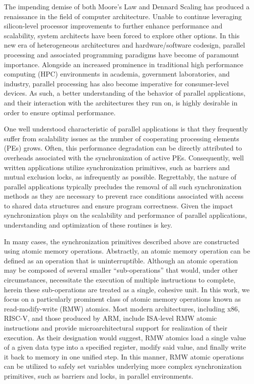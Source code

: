 
The impending demise of both Moore's Law and Dennard Scaling has produced a renaissance in the field of computer architecture.
Unable to continue leveraging silicon-level processor improvements to further enhance performance and scalability, system architects have been forced to explore other options.
In this new era of heterogeneous architectures and hardware/software codesign, parallel processing and associated programming paradigms have become of paramount importance.
Alongside an increased prominence in traditional high performance computing (HPC) environments in academia, government laboratories, and industry, parallel processing has also become imperative for consumer-level devices.
As such, a better understanding of the behavior of parallel applications, and their interaction with the architectures they run on, is highly desirable in order to ensure optimal performance.

One well understood characteristic of parallel applications is that they frequently suffer from scalability issues as the number of cooperating processing elements (PEs) grows.
Often, this performance degradation can be directly attributed to overheads associated with the synchronization of active PEs.
Consequently, well written applications utilize synchronization primitives, such as barriers and mutual exclusion locks, as infrequently as possible.
Regrettably, the nature of parallel applications typically precludes the removal of all such synchronization methods as they are necessary to prevent race conditions associated with access to shared data structures and ensure program correctness.
Given the impact synchronization plays on the scalability and performance of parallel applications, understanding and optimization of these routines is key.

In many cases, the synchronization primitives described above are constructed using atomic memory operations.
Abstractly, an atomic memory operation can be defined as an operation that is uninterruptible.
Although an atomic operation may be composed of several smaller ``sub-operations'' that would, under other circumstances, necessitate the execution of multiple instructions to complete, herein these sub-operations are treated as a single, cohesive unit.
In this work, we focus on a particularly prominent class of atomic memory operations known as read-modify-write (RMW) atomics.
Most modern architectures, including x86, RISC-V, and those produced by ARM, include ISA-level RMW atomic instructions and provide microarchitectural support for realization of their execution.
As their designation would suggest, RMW atomics load a single value of a given data type into a specified register, modify said value, and finally write it back to memory in one unified step.
In this manner, RMW atomic operations can be utilized to safely set variables underlying more complex synchronization primitives, such as barriers and locks, in parallel environments.

